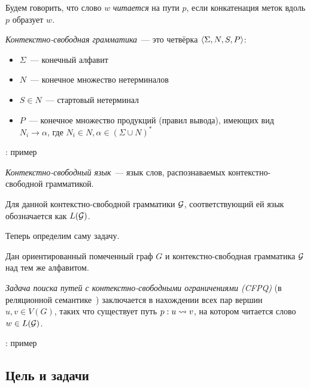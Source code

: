 \begin{definition}
Будем говорить, что слово $w$ \textit{читается} на пути $p$, если конкатенация меток вдоль $p$ образует $w$. 
\end{definition}

\begin{definition}
\textit{Контекстно-свободная грамматика}~--- это четвёрка $\langle \Sigma, N, S, P \rangle$:
\begin{itemize}
  \setlength\itemsep{-0.1em}
  \item $\Sigma$~--- конечный алфавит
  \item $N$~--- конечное множество нетерминалов
  \item $S \in N$~--- стартовый нетерминал
  \item $P$~--- конечное множество продукций (правил вывода), имеющих вид\\ $N_i \to \alpha$, где $N_i \in N, \alpha \in (\Sigma \cup N)^{*}$
\end{itemize}
\end{definition}

\TODO: пример

\begin{definition}
\textit{Контекстно-свободный язык}~--- язык слов, распознаваемых контекстно-свободной грамматикой.

Для данной контекстно-свободной грамматики $\mathcal{G}$, соответствующий ей язык обозначается как $L(\mathcal{G})$. 
\end{definition}

Теперь определим саму задачу.

\begin{definition}
  Дан ориентированный помеченный граф $G$ и контекстно-свободная грамматика $\mathcal{G}$ над тем же алфавитом.

  \textit{Задача поиска путей с контекстно-свободными ограничениями (CFPQ)} (в реляционной семантике~\cite{Hellings16}) заключается в нахождении всех пар вершин $u, v \in V(G)$, таких что существует путь $p: u \rightsquigarrow v$, на котором читается слово $w \in L(\mathcal{G})$.

\end{definition}

\TODO: пример


\subsection*{Цель и задачи}

